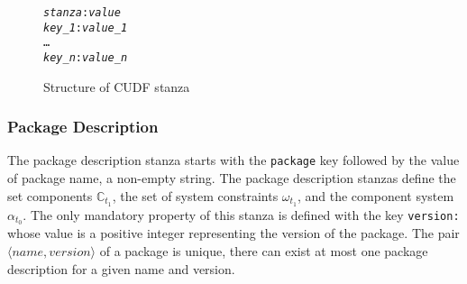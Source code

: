 \begin{figure}[htp] 
\begin{center}
\begin{alltt}
\textit{stanza}: \textit{value}
\textit{key_1}: \textit{value_1}
\ldots
\textit{key_n}: \textit{value_n}
\end{alltt}
  \caption{Structure of  CUDF stanza}
  \label{formal.cudfstanza}
\end{center}
\end{figure}

\subsubsection{Package Description}
The package description stanza starts with the \verb+package+ key followed by the value of package name, a non-empty string.
The package description stanzas define the set components $\mathbb{C}_{t_1}$, the set of system constraints $\omega_{t_1}$, and the component system $\alpha_{t_{0}}$.
The only mandatory property of this stanza is defined with the key \verb+version:+ whose value is a positive integer representing the version of the package.
The pair $\langle name, version \rangle$ of a package is unique, there can exist at most one package description for a given name and version.


